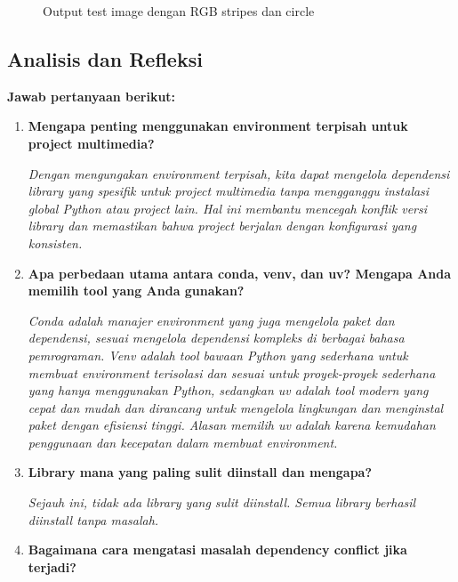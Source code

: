 \documentclass[11pt,a4paper]{article}
\begin{document}
\begin{itemize}
\begin{figure}[H]
        \caption{Output test image dengan RGB stripes dan circle} 
        \vspace{0.1cm}
        \end{figure}
\end{itemize}

\subsection{Analisis dan Refleksi}
\textbf{Jawab pertanyaan berikut:}

\begin{enumerate}
    \item \textbf{Mengapa penting menggunakan environment terpisah untuk project multimedia?}
    
    \textit{Dengan mengungakan environment terpisah, kita dapat mengelola dependensi library yang spesifik untuk project multimedia tanpa mengganggu instalasi global Python atau project lain. Hal ini membantu mencegah konflik versi library dan memastikan bahwa project berjalan dengan konfigurasi yang konsisten.}
    
    \item \textbf{Apa perbedaan utama antara conda, venv, dan uv? Mengapa Anda memilih tool yang Anda gunakan?}
    
    \textit{Conda adalah manajer environment yang juga mengelola paket dan dependensi, sesuai mengelola dependensi kompleks di berbagai bahasa pemrograman. Venv adalah tool bawaan Python yang sederhana untuk membuat environment terisolasi dan sesuai untuk proyek-proyek sederhana yang hanya menggunakan Python, sedangkan uv adalah tool modern yang cepat dan mudah dan dirancang untuk mengelola lingkungan dan menginstal paket dengan efisiensi tinggi. Alasan memilih uv adalah karena kemudahan penggunaan dan kecepatan dalam membuat environment.}
    
    \item \textbf{Library mana yang paling sulit diinstall dan mengapa?}
    
    \textit{Sejauh ini, tidak ada library yang sulit diinstall. Semua library berhasil diinstall tanpa masalah.}
    
    \item \textbf{Bagaimana cara mengatasi masalah dependency conflict jika terjadi?}
    

\end{enumerate}
\end{document}
